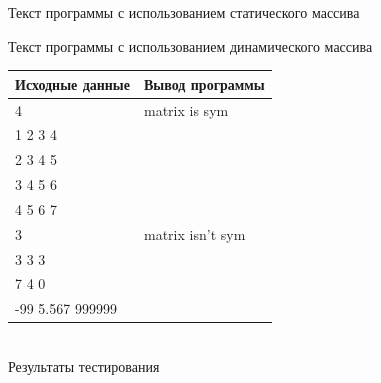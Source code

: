 \documentclass[a4paper,14pt]{extarticle}
\begin{document}

\begin{center}
Текст программы с использованием статического массива\\
\end{center}

\begin{center}
Текст программы с использованием динамического массива\\
\vspace{0.6cm}
\begin{tabular}{|l|l|}
\hline
\multicolumn{1}{|c|}{Исходные данные}& \multicolumn{1}{|c|}{Вывод программы}\\
\hline
4 & matrix is sym \\
1 2 3 4 & \\
2 3 4 5 & \\
3 4 5 6 & \\
4 5 6 7 & \\
\hline
3 & matrix isn't sym \\
3 3 3 & \\
7 4 0 & \\      
-99 5.567 999999 & \\
\hline
\end{tabular}\\
\vspace{0.3cm}
Результаты тестирования
\end{center}
\end{document}
